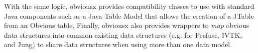 With the same logic, obviousx provides compatibility classes to use
with standard Java components such as a Java Table Model that allows
the creation of a JTable from an Obvious table.  Finally, obviousx
also provides wrappers to \emph{map} obvious data structures into
common existing data structures (e.g. for Prefuse, IVTK, and Jung) to
share data structures when using more than one data model.

